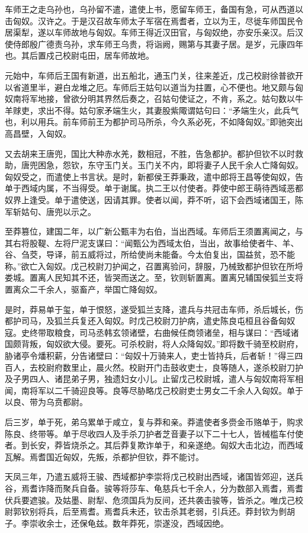 \documentclass[]{article}
\begin{document}
车师王之走乌孙也，乌孙留不遣，遣使上书，愿留车师王，备国有急，可从西道以击匈奴。汉许之。于是汉召故车师太子军宿在焉耆者，立以为王，尽徙车师国民令居渠犁，遂以车师故地与匈奴。车师王得近汉田官，与匈奴绝，亦安乐亲汉。后汉使侍郎殷广德责乌孙，求车师王乌贵，将诣阙，赐第与其妻子居。是岁，元康四年也。其后置戍己校尉屯田，居车师故地。

元始中，车师后王国有新道，出五船北，通玉门关，往来差近，戊己校尉徐普欲开以省道里半，避白龙堆之厄。车师后王姑句以道当为拄置，心不便也。地又颇与匈奴南将军地接，曾欲分明其界然后奏之，召姑句使证之，不肯，系之。姑句数以牛羊赇吏，求出不得。姑句家矛端生火，其妻股紫陬谓姑句曰：``矛端生火，此兵气也，利以用兵。前车师前王为都护司马所杀，今久系必死，不如降匈奴。''即驰突出高昌壁，入匈奴。

又去胡来王唐兜，国比大种赤水羌，数相冠，不胜，告急都护。都护但钦不以时救助，唐兜困急，怨钦，东守玉门关。玉门关不内，即将妻子人民千余人亡降匈奴。匈奴受之，而遣使上书言状。是时，新都侯王莽秉政，遣中郎将王昌等使匈奴，告单于西域内属，不当得受。单于谢属。执二王以付使者。莽使中郎王萌待西域恶都奴界上逢受。单于遣使送，因请其罪。使者以闻，莽不听，诏下会西域诸国王，陈军斩姑句、唐兜以示之。

至莽篡位，建国二年，以广新公甄丰为右伯，当出西域。车师后王须置离闻之，与其右将股鞮、左将尸泥支谋曰：``闻甄公为西域太伯，当出，故事给使者牛、羊、谷、刍茭，导译，前五威将过，所给使尚未能备。今太伯复出，国益贫，恐不能称。''欲亡入匈奴。戊己校尉刀护闻之，召置离验问，辞服，乃械致都护但钦在所埒娄城。置离人民知其不还，皆哭而送之。至，钦则斩置离。置离兄辅国侯狐兰支将置离众二千余人，驱畜产，举国亡降匈奴。

是时，莽易单于玺，单于恨怒，遂受狐兰支降，遣兵与共冠击车师，杀后城长，伤都护司马，及狐兰兵复还入匈奴。时戊己校尉刀护病，遣史陈良屯桓且谷备匈奴寇。史终带取粮食，司马丞韩玄领诸壁，右曲候任商领诸垒，相与谋曰：``西域诸国颇背叛，匈奴欲大侵。要死。可杀校尉，将人众降匈奴。''即将数千骑至校尉府，胁诸亭令燔积薪，分告诸壁曰：``匈奴十万骑来人，吏士皆持兵，后者斩！''得三四百人，去校尉府数里止，晨火然。校尉开门击鼓收吏士，良等随人，遂杀校尉刀护及子男四人、诸昆弟子男，独遗妇女小儿。止留戊己校尉城，遣人与匈奴南将军相闻，南将军以二千骑迎良等。良等尽胁略戊己校尉吏士男女二千余人入匈奴。单于以良、带为乌贲都尉。

后三岁，单于死，弟乌累单于咸立，复与莽和亲。莽遣使者多赍金币赂单于，购求陈良、终带等。单于尽收四人及手杀刀护者芝音妻子以下二十七人，皆械槛车付使者。到长安，莽皆烧杀之。其后莽复欺诈单于，和亲遂绝。匈奴大击北边，而西域瓦解。焉耆国近匈奴，先叛，杀都护但钦，莽不能讨。

天凤三年，乃遣五威将王骏、西域都护李崇将戊己校尉出西域，诸国皆郊迎，送兵谷，焉耆诈降而聚兵自备。骏等将莎车、龟慈兵七千余人，分为数部入焉耆，焉耆伏兵要遮骏。及姑墨、尉犁、危须国兵为反间，还共袭击骏等，皆杀之。唯戊己校尉郭钦别将兵，后至焉耆。焉耆兵未还，钦击杀其老弱，引兵还。莽封钦为剼胡子。李崇收余士，还保龟兹。数年莽死，崇遂没，西域因绝。
\end{document}
